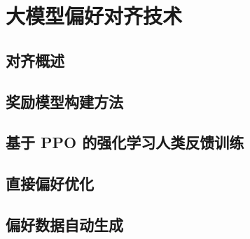 \section{大模型偏好对齐技术}
\subsection{对齐概述}

\subsection{奖励模型构建方法}

\subsection{基于 PPO 的强化学习人类反馈训练}

\subsection{直接偏好优化}

\subsection{偏好数据自动生成}

